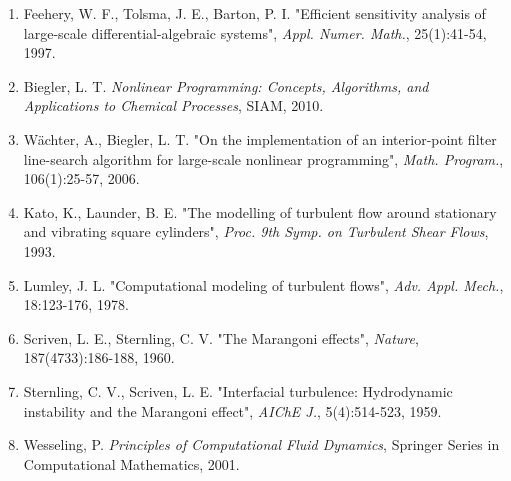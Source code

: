 \documentclass[11pt,a4paper]{article}
\begin{document}
\begin{enumerate}[leftmargin=*]
    \item Feehery, W. F., Tolsma, J. E., Barton, P. I. "Efficient sensitivity analysis of large-scale differential-algebraic systems", \textit{Appl. Numer. Math.}, 25(1):41-54, 1997.
    \item Biegler, L. T. \textit{Nonlinear Programming: Concepts, Algorithms, and Applications to Chemical Processes}, SIAM, 2010.
    \item W\"achter, A., Biegler, L. T. "On the implementation of an interior-point filter line-search algorithm for large-scale nonlinear programming", \textit{Math. Program.}, 106(1):25-57, 2006.
    \item Kato, K., Launder, B. E. "The modelling of turbulent flow around stationary and vibrating square cylinders", \textit{Proc. 9th Symp. on Turbulent Shear Flows}, 1993.
    \item Lumley, J. L. "Computational modeling of turbulent flows", \textit{Adv. Appl. Mech.}, 18:123-176, 1978.
    \item Scriven, L. E., Sternling, C. V. "The Marangoni effects", \textit{Nature}, 187(4733):186-188, 1960.
    \item Sternling, C. V., Scriven, L. E. "Interfacial turbulence: Hydrodynamic instability and the Marangoni effect", \textit{AIChE J.}, 5(4):514-523, 1959.
    \item Wesseling, P. \textit{Principles of Computational Fluid Dynamics}, Springer Series in Computational Mathematics, 2001.
\end{enumerate}
\end{document}
